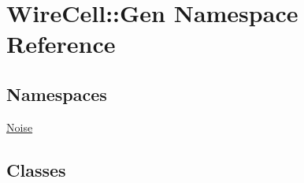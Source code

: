 \hypertarget{namespace_wire_cell_1_1_gen}{}\section{Wire\+Cell\+:\+:Gen Namespace Reference}
\label{namespace_wire_cell_1_1_gen}
\subsection*{Namespaces}
\begin{DoxyCompactItemize}
\item 
 \hyperlink{namespace_wire_cell_1_1_gen_1_1_noise}{Noise}
\end{DoxyCompactItemize}
\subsection*{Classes}
